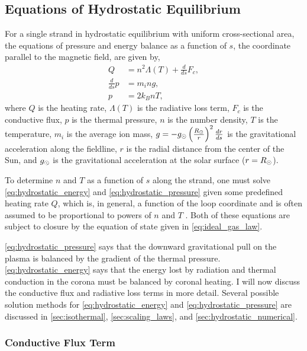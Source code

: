 \subsection{Equations of Hydrostatic Equilibrium}\label{sec:hydrostatic_equations}

For a single strand in hydrostatic equilibrium with uniform cross-sectional area, the equations of pressure and energy balance as a function of $s$, the coordinate parallel to the magnetic field, are given by,
\begin{align}
    Q &= n^2\Lambda(T) + \frac{d}{ds}F_c, \label{eq:hydrostatic_energy} \\
    \frac{d}{ds}p &= m_ing, \label{eq:hydrostatic_pressure} \\
    p &= 2k_BnT, \label{eq:ideal_gas_law}
\end{align}
where $Q$ is the heating rate, $\Lambda(T)$ is the radiative loss term, $F_c$ is the conductive flux, $p$ is the thermal pressure, $n$ is the number density, $T$ is the temperature, $m_i$ is the average ion mass, $g=-g_\odot\left(\frac{R_\odot}{r}\right)^2\frac{dr}{ds}$ is the gravitational acceleration along the fieldline, $r$ is the radial distance from the center of the Sun, and $g_\odot$ is the gravitational acceleration at the solar surface ($r=R_\odot$).

To determine $n$ and $T$ as a function of $s$ along the strand, one must solve \autoref{eq:hydrostatic_energy} and \autoref{eq:hydrostatic_pressure} given some predefined heating rate $Q$, which is, in general, a function of the loop coordinate and is often assumed to be proportional to powers of $n$ and $T$ \citep{priest_magnetohydrodynamics_2014}. Both of these equations are subject to closure by the equation of state given in \autoref{eq:ideal_gas_law}.

\autoref{eq:hydrostatic_pressure} says that the downward gravitational pull on the plasma is balanced by the gradient of the thermal pressure. \autoref{eq:hydrostatic_energy} says that the energy lost by radiation and thermal conduction in the corona must be balanced by coronal heating. I will now discuss the conductive flux and radiative loss terms in more detail. Several possible solution methods for \autoref{eq:hydrostatic_energy} and \autoref{eq:hydrostatic_pressure} are discussed in \autoref{sec:isothermal}, \ref{sec:scaling_laws}, and \ref{sec:hydrostatic_numerical}.

\subsubsection{Conductive Flux Term}\label{sec:heat-flux}

